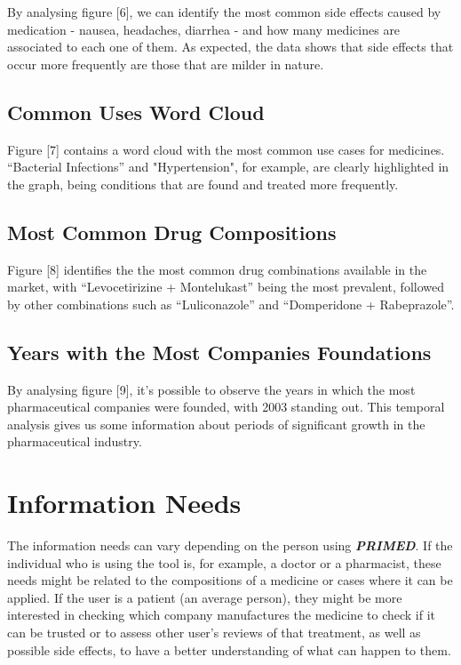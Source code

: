 \documentclass[sigconf]{acmart}
\begin{document}
By analysing figure [6], we can identify the most common side effects caused by medication - nausea, headaches, diarrhea - and how many medicines are associated to each one of them. As expected, the data shows that side effects that occur more frequently are those that are milder in nature.

\subsection{Common Uses Word Cloud}

Figure [7] contains a word cloud with the most common use cases for medicines. “Bacterial Infections” and "Hypertension", for example, are clearly highlighted in the graph, being conditions that are found and treated more frequently.

\subsection{Most Common Drug Compositions}

Figure [8] identifies the the most common drug combinations available in the market, with “Levocetirizine + Montelukast” being the most prevalent, followed by other combinations such as “Luliconazole” and “Domperidone + Rabeprazole”.

\subsection{Years with the Most Companies Foundations}	

By analysing figure [9], it's possible to observe the years in which the most pharmaceutical companies were founded, with 2003 standing out. This temporal analysis gives us some information about periods of significant growth in the pharmaceutical industry.

\section{Information Needs}

The information needs can vary depending on the person using \textit{\textbf{PRIMED}}. If the individual who is using the tool is, for example, a doctor or a pharmacist, these needs might be related to the compositions of a medicine or cases where it can be applied. If the user is a patient (an average person), they might be more interested in checking which company manufactures the medicine to check if it can be trusted or to assess other user's reviews of that treatment, as well as possible side effects, to have a better understanding of what can happen to them.
\end{document}
